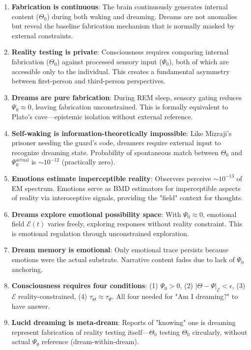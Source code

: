 \documentclass[11pt,a4paper]{article}
\begin{document}
\begin{enumerate}
\item \textbf{Fabrication is continuous}: The brain continuously generates internal content ($\Theta_0$) during both waking and dreaming. Dreams are not anomalies but reveal the baseline fabrication mechanism that is normally masked by external constraints.

\item \textbf{Reality testing is private}: Consciousness requires comparing internal fabrication ($\Theta_0$) against processed sensory input ($\Psi_0$), both of which are accessible only to the individual. This creates a fundamental asymmetry between first-person and third-person perspectives.

\item \textbf{Dreams are pure fabrication}: During REM sleep, sensory gating reduces $\Psi_0 \approx 0$, leaving fabrication unconstrained. This is formally equivalent to Plato's cave—epistemic isolation without external reference.

\item \textbf{Self-waking is information-theoretically impossible}: Like Mizraji's prisoner needing the guard's code, dreamers require external input to recognize dreaming state. Probability of spontaneous match between $\Theta_0$ and $\Psi_0^{\text{actual}}$ is $\sim 10^{-12}$ (practically zero).

\item \textbf{Emotions estimate imperceptible reality}: Observers perceive $\sim 10^{-13}$ of EM spectrum. Emotions serve as BMD estimators for imperceptible aspects of reality via interoceptive signals, providing the "field" context for thoughts.

\item \textbf{Dreams explore emotional possibility space}: With $\Psi_0 \approx 0$, emotional field $\mathcal{E}(t)$ varies freely, exploring responses without reality constraint. This is emotional regulation through unconstrained exploration.

\item \textbf{Dream memory is emotional}: Only emotional trace persists because emotions were the actual substrate. Narrative content fades due to lack of $\Psi_0$ anchoring.

\item \textbf{Consciousness requires four conditions}: (1) $\Psi_0 > 0$, (2) $|\Theta - \Psi|_{\mathcal{E}} < \epsilon$, (3) $\mathcal{E}$ reality-constrained, (4) $\tau_{\Theta} \approx \tau_{\Psi}$. All four needed for "Am I dreaming?" to have answer.

\item \textbf{Lucid dreaming is meta-dream}: Reports of "knowing" one is dreaming represent fabrication of reality testing itself—$\Theta_0$ testing $\Theta_0$ circularly, without actual $\Psi_0$ reference (dream-within-dream).
\end{enumerate}
\end{document}
